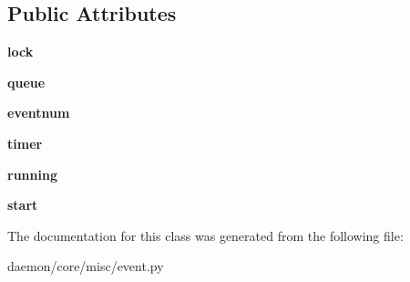 \subsection*{Public Attributes}
\begin{DoxyCompactItemize}
\item 
\hypertarget{classcore_1_1misc_1_1event_1_1_event_loop_a6604c9e4db08c9225806b565f2efa09a}{{\bfseries lock}}\label{classcore_1_1misc_1_1event_1_1_event_loop_a6604c9e4db08c9225806b565f2efa09a}

\item 
\hypertarget{classcore_1_1misc_1_1event_1_1_event_loop_a73c5d61cb60015f8671d16ca31fb08c0}{{\bfseries queue}}\label{classcore_1_1misc_1_1event_1_1_event_loop_a73c5d61cb60015f8671d16ca31fb08c0}

\item 
\hypertarget{classcore_1_1misc_1_1event_1_1_event_loop_aa6a3ee686118711550c16dec02afc365}{{\bfseries eventnum}}\label{classcore_1_1misc_1_1event_1_1_event_loop_aa6a3ee686118711550c16dec02afc365}

\item 
\hypertarget{classcore_1_1misc_1_1event_1_1_event_loop_adcd7339743f9d2823e4228ed2f4e190a}{{\bfseries timer}}\label{classcore_1_1misc_1_1event_1_1_event_loop_adcd7339743f9d2823e4228ed2f4e190a}

\item 
\hypertarget{classcore_1_1misc_1_1event_1_1_event_loop_a1a5a2515f7b4b12aab6f4783f6c1722d}{{\bfseries running}}\label{classcore_1_1misc_1_1event_1_1_event_loop_a1a5a2515f7b4b12aab6f4783f6c1722d}

\item 
\hypertarget{classcore_1_1misc_1_1event_1_1_event_loop_a2c16931718ce5511c1c51ba041e71b3b}{{\bfseries start}}\label{classcore_1_1misc_1_1event_1_1_event_loop_a2c16931718ce5511c1c51ba041e71b3b}

\end{DoxyCompactItemize}


The documentation for this class was generated from the following file\+:\begin{DoxyCompactItemize}
\item 
daemon/core/misc/event.\+py\end{DoxyCompactItemize}

